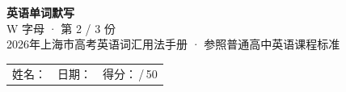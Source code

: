 \documentclass[10pt,a4paper]{article}
\begin{document}
\pagestyle{plain}

\begin{center}
{\LARGE\bfseries 英语单词默写}\\[0.22em]
{\large W 字母 · 第 2 / 3 份}\\[0.18em]
{\small 2026年上海市高考英语词汇用法手册 · 参照普通高中英语课程标准}
\end{center}

\vspace{0.25em}
\noindent\begin{tabular}{@{}p{}@{}p{}@{}p{}@{}}
姓名：\underline{\hspace{2.0cm}} & 日期：\underline{\hspace{2.0cm}} & 得分：\underline{\hspace{1.3cm}}\,/\,50 \\
\end{tabular}

\vspace{0.3em}

\vspace{0.08em}
\end{document}
